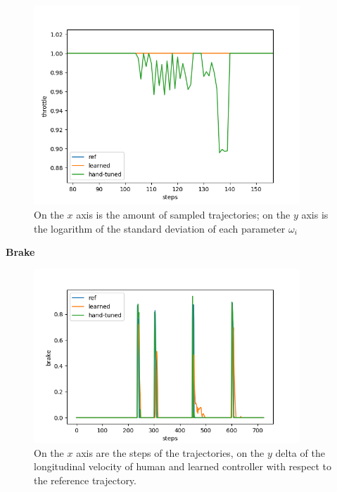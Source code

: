 \begin{figure}[H]
 \centering
  \captionsetup{width=10cm}
  \includegraphics[width=10cm]{./img/action_pois/throttle_rettilineo}
  \caption{On the $x$ axis is the amount of sampled trajectories; on the $y$ axis is the logarithm of the standard deviation of each parameter $\omega_i$}
   \label{fig:throttleexplrett}
\end{figure}





\textbf{Brake}
\begin{figure}[H]
\hspace*{-1cm}
 \centering
  \captionsetup{width=10cm}
  \includegraphics[width=10cm]{./img/action_pois/brake}
  \caption{On the $x$ axis are the steps of the trajectories, on the $y$ delta of the longitudinal velocity of human and learned controller with respect to the reference trajectory.}
   \label{fig:brake}
\end{figure}


